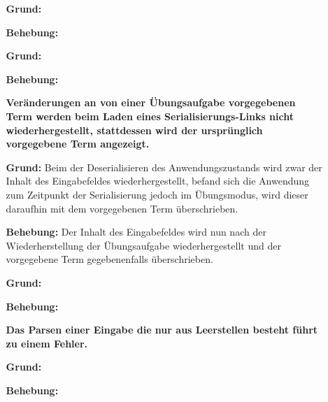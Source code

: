 \documentclass[parskip=full,11pt]{scrartcl}
\begin{document}
\begin{itemize}[itemsep=3ex]
\item[] %
\begin{itemize}[noitemsep]
\item[] {\bfseries  }
\item [\textbf{Grund:}]
\item [\textbf{Behebung:}]
\end{itemize}

\item[] %
\begin{itemize}[noitemsep]
\item[] {\bfseries  }
\item [\textbf{Grund:}]
\item [\textbf{Behebung:}]
\end{itemize}


\item[] %
\begin{itemize}[noitemsep]
\item[] {\bfseries Veränderungen an von einer Übungsaufgabe vorgegebenen Term  werden beim Laden eines Serialisierungs-Links nicht wiederhergestellt, stattdessen wird der ursprünglich vorgegebene Term angezeigt. }
\item [\textbf{Grund:}] Beim der Deserialisieren des Anwendungszustands wird zwar der Inhalt des Eingabefeldes wiederhergestellt, befand sich die Anwendung zum Zeitpunkt der Serialisierung jedoch im Übungsmodus, wird dieser daraufhin mit dem vorgegebenen Term überschrieben. 
\item [\textbf{Behebung:}] Der Inhalt des Eingabefeldes wird nun nach der Wiederherstellung der Übungsaufgabe wiederhergestellt und der vorgegebene Term gegebenenfalls überschrieben.
\end{itemize}

\item[] %
\begin{itemize}[noitemsep]
\item[] {\bfseries }
\item [\textbf{Grund:}]
\item [\textbf{Behebung:}]
\end{itemize}

\item[] %
\begin{itemize}[noitemsep]
\item[] {\bfseries Das Parsen einer Eingabe die nur aus Leerstellen besteht führt zu einem Fehler.}
\item [\textbf{Grund:}]
\item [\textbf{Behebung:}]
\end{itemize}


\end{itemize}
\end{document}
